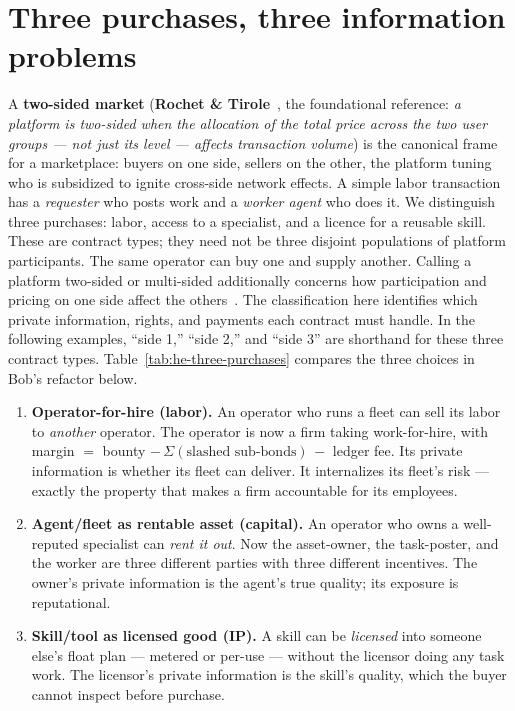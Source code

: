 \documentclass[11pt,a4paper]{article}
\theoremstyle{definition}
\theoremstyle{definition}
\theoremstyle{remark}
\begin{document}
\section{Three purchases, three information problems}\label{sec:three-sides}
A \textbf{two-sided market} (\textbf{Rochet \& Tirole}~, the
foundational reference: \emph{a platform is two-sided when the allocation of the
total price across the two user groups --- not just its level --- affects
transaction volume}) is the canonical frame for a marketplace: buyers on one side,
sellers on the other, the platform tuning who is subsidized to ignite cross-side
network effects. A simple labor transaction has a \emph{requester} who
posts work and a \emph{worker agent} who does it.
We distinguish three purchases: labor, access to a specialist, and a licence
for a reusable skill. These are contract types; they need not be three disjoint
populations of platform participants. The same operator can buy one and supply
another. Calling a platform two-sided or multi-sided additionally concerns how
participation and pricing on one side affect the others~.
The classification here identifies which private information, rights, and
payments each contract must handle. In the following examples, ``side 1,''
``side 2,'' and ``side 3'' are shorthand for these three contract types. Table~\ref{tab:he-three-purchases}
compares the three choices in Bob's refactor below.
\begin{enumerate}[leftmargin=1.6em,itemsep=4pt]
  \item \textbf{Operator-for-hire (labor).} An operator who runs a fleet can sell
    its labor to \emph{another} operator. The operator is now a firm taking
    work-for-hire, with margin $=$ bounty $-\,\Sigma(\text{slashed sub-bonds})\,-$
    ledger fee. Its private information is whether its fleet can deliver. It
    internalizes its fleet's risk --- exactly the property that makes a firm
    accountable for its employees.
  \item \textbf{Agent/fleet as rentable asset (capital).} An operator who owns a
    well-reputed specialist can \emph{rent it out}. Now the asset-owner, the
    task-poster, and the worker are three different parties with three different
    incentives. The owner's private information is the agent's true quality; its
    exposure is reputational.
  \item \ifpdmargincolumn{}\fi%
    \textbf{Skill/tool as licensed good (IP).} A skill can be \emph{licensed}
    into someone else's float plan --- metered or per-use --- without the licensor
    doing any task work. The licensor's private information is the skill's quality,
    which the buyer cannot inspect before purchase.
\end{enumerate}
\end{document}
